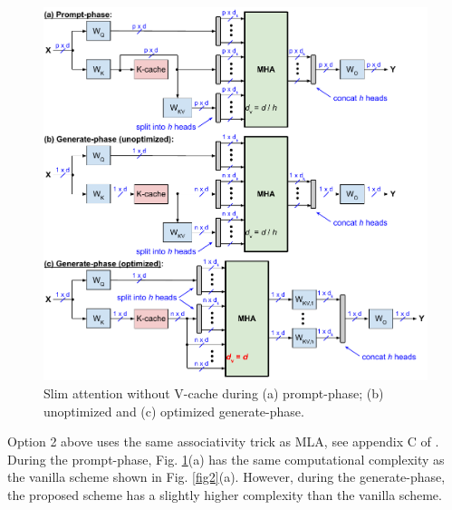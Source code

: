 \documentclass{article}
\begin{document}
\begin{figure}[h!] \centering
  \includegraphics[scale=0.71]{../doc/fig/slimAttn_fig3.pdf}
  \caption{Slim attention without V-cache during (a) prompt-phase; (b) unoptimized and (c) optimized generate-phase.}
\label{fig3} \end{figure}

Option 2 above uses the same associativity trick as MLA, see appendix C of \citep{deepseek-v2}. During the prompt-phase, Fig. \ref{fig3}(a) has the same computational complexity as the vanilla scheme shown in Fig. \ref{fig2}(a). However, during the generate-phase, the proposed scheme has a slightly higher complexity than the vanilla scheme.
\end{document}
